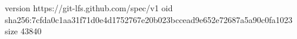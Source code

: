 version https://git-lfs.github.com/spec/v1
oid sha256:7cfda0c1aa31f71d0e4d1752767e20b023bccead9e652e72687a5a90c0fa1023
size 43840
